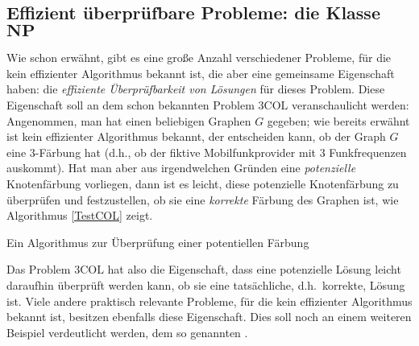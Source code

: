 \subsection{Effizient überprüfbare Probleme: die Klasse $\mathbf{NP}$}

Wie schon erwähnt, gibt es eine große Anzahl verschiedener Probleme,
für die kein effizienter Algorithmus bekannt ist, die aber eine
gemeinsame Eigenschaft haben: die \emph{effiziente Überprüfbarkeit von
Lösungen} für dieses Problem. Diese Eigenschaft soll an dem schon
bekannten Problem $3\mathrm{COL}$ veranschaulicht werden: Angenommen,
man hat einen beliebigen Graphen $G$ gegeben; wie bereits erwähnt ist
kein effizienter Algorithmus bekannt, der entscheiden kann, ob der
Graph $G$ eine $3$-Färbung hat (d.h., ob der fiktive Mobilfunkprovider
mit $3$ Funkfrequenzen auskommt). Hat man aber aus irgendwelchen
Gründen eine \emph{potenzielle} Knotenfärbung vorliegen, dann ist es
leicht, diese potenzielle Knotenfärbung zu überprüfen und
festzustellen, ob sie eine \emph{korrekte} Färbung des Graphen ist, 
wie Algorithmus \ref{TestCOL} zeigt.

\begin{algorithm}
\caption{Ein Algorithmus zur Überprüfung einer potentiellen Färbung}
\label{TestCOL}
\BlankLine
{}
\end{algorithm}

Das Problem $3\mathrm{COL}$ hat also die Eigenschaft, dass eine
potenzielle Lösung leicht daraufhin überprüft werden kann, ob sie eine
tatsächliche, d.h.~korrekte, Lösung ist.  Viele andere praktisch
relevante Probleme, für die kein effizienter Algorithmus bekannt ist,
besitzen ebenfalls diese Eigenschaft. Dies soll noch an einem weiteren
Beispiel verdeutlicht werden, dem so genannten
.

